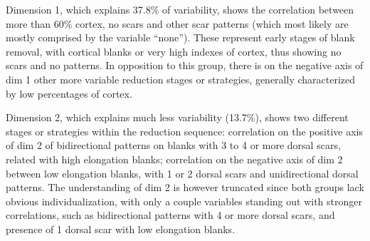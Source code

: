 \documentclass[12pt,twoside]{reedthesis}
\begin{document}
Dimension 1, which explains 37.8\% of variability, shows the correlation between more than 60\% cortex, no scars and other scar patterns (which most likely are mostly comprised by the variable ``none''). These represent early stages of blank removal, with cortical blanks or very high indexes of cortex, thus showing no scars and no patterns. In opposition to this group, there is on the negative axis of dim 1 other more variable reduction stages or strategies, generally characterized by low percentages of cortex.

Dimension 2, which explains much less variability (13.7\%), shows two different stages or strategies within the reduction sequence: correlation on the positive axis of dim 2 of bidirectional patterns on blanks with 3 to 4 or more dorsal scars, related with high elongation blanks; correlation on the negative axis of dim 2 between low elongation blanks, with 1 or 2 dorsal scars and unidirectional dorsal patterns. The understanding of dim 2 is however truncated since both groups lack obvious individualization, with only a couple variables standing out with stronger correlations, such as bidirectional patterns with 4 or more dorsal scars, and presence of 1 dorsal scar with low elongation blanks.
\end{document}
